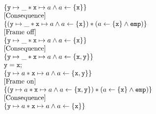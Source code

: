 \documentclass[xcolor=x11names,compress]{beamer}
\renewcommand{\(}{\begin{columns}}
\renewcommand{\)}{\end{columns}}
\newcommand{\<}[1]{\begin{column}{#1}}
\renewcommand{\>}{\end{column}}
\begin{document}
\begin{frame}
\[
\begin{array}{l}
  \{\mathtt{y}\mapsto\_ \mathbin{*} \mathtt{x} \mapsto a \land a \leftarrow \{\mathtt{x}\} \}\\
  \text{[Consequence]}\\
  \{(\mathtt{y}\mapsto\_ \mathbin{*} \mathtt{x} \mapsto a \land a \leftarrow \{\mathtt{x}\}) \mathbin{*} (a \leftarrow \{\mathtt{x}\} \land \texttt{emp}) \}\\
  \text{[Frame off]}\\
  \{\mathtt{y}\mapsto\_ \mathbin{*} \mathtt{x} \mapsto a \land a \leftarrow \{\mathtt{x}\} \}\\
  \text{[Consequence]}\\
  \{\mathtt{y}\mapsto\_ \mathbin{*} \mathtt{x} \mapsto a \land a \leftarrow \{\mathtt{x},\mathtt{y}\} \}\\
  \mathtt{y = x;}\\
  \{\mathtt{y}\mapsto a \mathbin{*} \mathtt{x} \mapsto a \land a \leftarrow \{\mathtt{x},\mathtt{y}\} \}\\
  \text{[Frame on]}\\
  \{(\mathtt{y}\mapsto a \mathbin{*} \mathtt{x} \mapsto a \land a \leftarrow \{\mathtt{x},\mathtt{y}\}) \mathbin{*} (a \leftarrow \{\mathtt{x}\} \land \texttt{emp}) \}\\
  \text{[Consequence]}\\
  \{\mathtt{y}\mapsto a \mathbin{*} \mathtt{x} \mapsto a \land a \leftarrow \{\mathtt{x}\} \}\\
\end{array}
\]
\end{frame}
\end{document}
